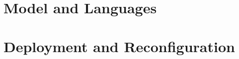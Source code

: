\documentclass[12pt,a4paper,openright,twoside]{book}
\theoremstyle{definition}
\begin{document}




\part{Model and Languages}







\part{Deployment and Reconfiguration}










\backmatter



\end{document}
